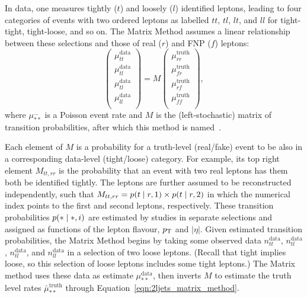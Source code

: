 In data, one measures tightly ($t$) and loosely ($l$) identified leptons, leading
to four categories of events with two ordered leptons as labelled $tt$, $tl$,
$lt$, and $ll$ for tight-tight, tight-loose, and so on.
The Matrix Method assumes a linear relationship between these selections
and those of real ($r$) and FNP ($f$) leptons:
\begin{equation}
\label{eqn:2ljets_matrix_method}
\begin{pmatrix}
\mu^\textrm{data}_{tt} \\
\mu^\textrm{data}_{tl} \\
\mu^\textrm{data}_{tl} \\
\mu^\textrm{data}_{ll} \\
\end{pmatrix}
=
M
\begin{pmatrix}
\mu^\textrm{truth}_{rr} \\
\mu^\textrm{truth}_{fr} \\
\mu^\textrm{truth}_{rf} \\
\mu^\textrm{truth}_{ff} \\
\end{pmatrix}
,
\end{equation}
where $\mu^{\ldots}_{**}$ is a Poisson event rate and $M$ is the
(left-stochastic) matrix of transition probabilities, after which this method
is named~\cite{ATLAS-CONF-2014-058}.

Each element of $M$ is a probability for a truth-level (real/fake) event to be
also in a corresponding data-level (tight/loose) category.
For example, its top right element $M_{{tt}, {rr}}$ is the
probability that an event with two real leptons has them both be identified
tightly.
The leptons are further assumed to be reconstructed independently, such that
$M_{{tt}, {rr}} =
p(t \mid r,1)
\times p(t \mid r,2)$
in which the numerical index points to the first and second leptons,
respectively.
These transition probabilities $p(* \mid *,i)$ are estimated by studies in
separate selections and assigned as functions of the lepton
flavour, $p_\mathrm{T}$ and $|\eta|$.
Given estimated transition probabilities, the Matrix Method begins by
taking some observed data
$n^\textrm{data}_{tt}$,
$n^\textrm{data}_{tl}$,
$n^\textrm{data}_{tl}$,
and $n^\textrm{data}_{ll}$
in a selection of two loose leptons.
(Recall that tight implies loose, so this selection of loose leptons includes
some tight leptons.)
The Matrix method uses these data as estimate $\mu^\textrm{data}_{**}$,
then inverts $M$ to estimate the truth level rates
$\bar \mu^\textrm{truth}_{**}$ through Equation~\ref{eqn:2ljets_matrix_method}.

